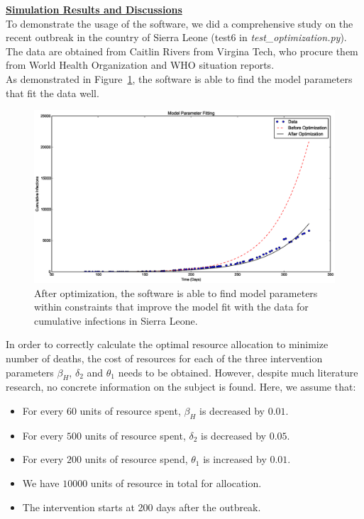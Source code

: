 \documentclass[11pt,letter]{article}
\begin{document}
\underline{\textbf{Simulation Results and Discussions}}\vspace{0.5mm}\\

To demonstrate the usage of the software, we did a comprehensive study on the recent outbreak in the country of Sierra Leone (test6 in \emph{test\_optimization.py}). The data are obtained from Caitlin Rivers from Virgina Tech, who procure them from World Health Organization and WHO situation reports. \\

As demonstrated in Figure~\ref{model_fit}, the software is able to find the model parameters that fit the data well. 
\begin{figure}
	\centering
	\includegraphics[width = 3.5 in]{model_fit.eps}
\caption{After optimization, the software is able to find model parameters within constraints that improve the model fit with the data for cumulative infections in Sierra Leone.
	\label{model_fit}}
\end{figure}
In order to correctly calculate the optimal resource allocation to minimize number of deaths, the cost of resources for each of the three intervention parameters $\beta_H$, $\delta_2$ and $\theta_1$ needs to be obtained. However, despite much literature research, no concrete information on the subject is found. Here, we assume that:
\begin{itemize}
\item For every $60$ units of resource spent, $\beta_H$ is decreased by $0.01$.
\item For every $500$ units of resource spent, $\delta_2$ is decreased by $0.05$.
\item For every $200$ units of resource spend, $\theta_1$ is increased by $0.01$.
\item We have $10000$ units of resource in total for allocation.
\item The intervention starts at 200 days after the outbreak.
\end{itemize}
\end{document}
